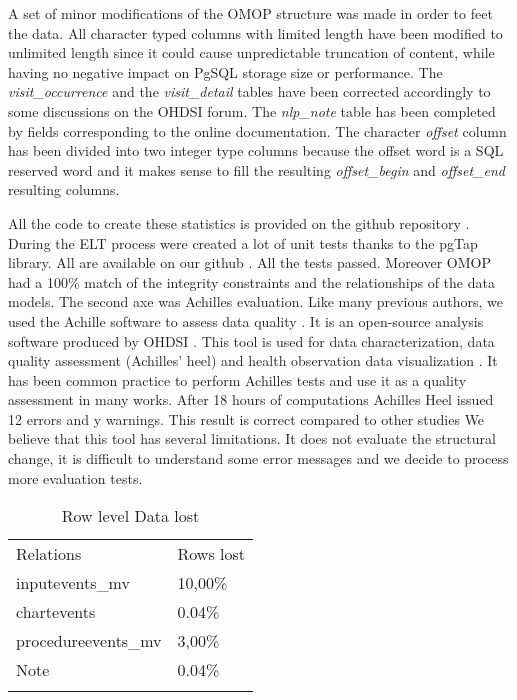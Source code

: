 A set of minor modifications of the OMOP structure was made in order to feet
the data. All character typed columns with limited length have been modified to
unlimited length since it could cause unpredictable truncation of content,
while having no negative impact on PgSQL storage size or performance. The
\textit{visit\_occurrence} and the \textit{visit\_detail} tables have been
corrected accordingly to some discussions on the OHDSI forum. The
\textit{nlp\_note} table has been completed by fields corresponding to the
online documentation. The character \textit{offset} column has been divided
into two integer type columns because the offset word is a SQL reserved word
and it makes sense to fill the resulting \textit{offset\_begin} and
\textit{offset\_end} resulting columns.


All the code to create these statistics is provided on the github repository
\cite{mimic-omop-website}. During the ELT process were created a lot of unit
tests thanks to the pgTap library. All are available on our github
\cite{mimic-omop-website}. All the tests passed. Moreover OMOP had a 100\%
match of the integrity constraints and the relationships of the data models.
The second axe was Achilles evaluation. Like many previous authors, we used the
Achille software to assess data quality \cite{achilles-evaluation}.  It is an
open-source analysis software produced by OHDSI \cite{ohdsi-achilles}.  This
tool is used for data characterization, data quality assessment (Achilles'
heel) and health observation data visualization \cite{ohdsi-achilles}.  It has
been common practice to perform Achilles tests and use it as a quality
assessment in many works. After 18 hours of computations Achilles Heel issued
12 errors and y warnings.  This result is correct compared to other studies
\cite{achilles-evaluation} We believe that this tool has several limitations.
It does not evaluate the structural change, it is difficult to understand some
error messages and we decide to process more evaluation tests. 

\begin{table}[t]
\caption{Row level Data lost}{
\begin{tabular}{@{}ll@{}}\toprule
Relations           & Rows lost        \\\colrule
inputevents\_mv     & 10,00\%          \\
chartevents         & 0.04\%           \\
procedureevents\_mv & 3,00\%           \\
Note                & 0.04\%           \\\botrule
\end{tabular}}
\label{table:lostrows}
\end{table}

